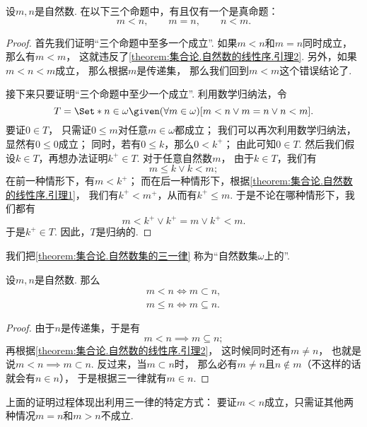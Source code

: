 \begin{theorem}[三一律]\label{theorem:集合论.自然数集的三一律}
设\(m,n\)是自然数.
在以下三个命题中，有且仅有一个是真命题：\begin{equation*}
	m < n, \qquad
	m = n, \qquad
	n < m.
\end{equation*}
\begin{proof}
首先我们证明“三个命题中至多一个成立”.
如果\(m < n\)和\(m = n\)同时成立，
那么有\(m < m\)，
这就违反了\cref{theorem:集合论.自然数的线性序.引理2}.
另外，如果\(m < n < m\)成立，
那么根据\(m\)是传递集，
那么我们回到\(m < m\)这个错误结论了.

接下来只要证明“三个命题中至少一个成立”.
利用数学归纳法，令\begin{equation*}
	T = \Set*{
		n \in \omega
		\given
		(\forall m \in \omega)
		[
			m < n
			\lor
			m = n
			\lor
			n < m
		]
	}.
\end{equation*}
要证\(0 \in T\)，
只需证\(0 \leq m\)对任意\(m \in \omega\)都成立；
我们可以再次利用数学归纳法，
显然有\(0 \leq 0\)成立；
同时，若有\(0 \leq k\)，那么\(0 < k^+\)；
由此可知\(0 \in T\).
然后我们假设\(k \in T\)，再想办法证明\(k^+ \in T\).
对于任意自然数\(m\)，
由于\(k \in T\)，我们有\begin{equation*}
	m \leq k
	\lor
	k < m;
\end{equation*}
在前一种情形下，有\(m < k^+\)；
而在后一种情形下，根据\cref{theorem:集合论.自然数的线性序.引理1}，
我们有\(k^+ < m^+\)，从而有\(k^+ \leq m\).
于是不论在哪种情形下，我们都有\begin{equation*}
	m < k^+
	\lor
	k^+ = m
	\lor
	k^+ < m.
\end{equation*}
于是\(k^+ \in T\).
因此，\(T\)是归纳的.
\end{proof}
\end{theorem}
我们把\cref{theorem:集合论.自然数集的三一律}
称为“自然数集\(\omega\)上的”.

\begin{corollary}\label{theorem:集合论.自然数集的三一律.推论1}
设\(m,n\)是自然数.
那么\begin{gather*}
	m < n \iff m \subset n, \\
	m \leq n \iff m \subseteq n.
\end{gather*}
\begin{proof}
由于\(n\)是传递集，于是有\begin{equation*}
	m < n \implies m \subseteq n;
\end{equation*}
再根据\cref{theorem:集合论.自然数的线性序.引理2}，
这时候同时还有\(m \neq n\)，
也就是说\(m < n \implies m \subset n\).
反过来，当\(m \subset n\)时，
那么必有\(m \neq n\)且\(n \notin m\)（不这样的话就会有\(n \in n\)），
于是根据三一律就有\(m \in n\).
\end{proof}
\end{corollary}
上面的证明过程体现出利用三一律的特定方式：
要证\(m < n\)成立，只需证其他两种情况\(m = n\)和\(m > n\)不成立.

